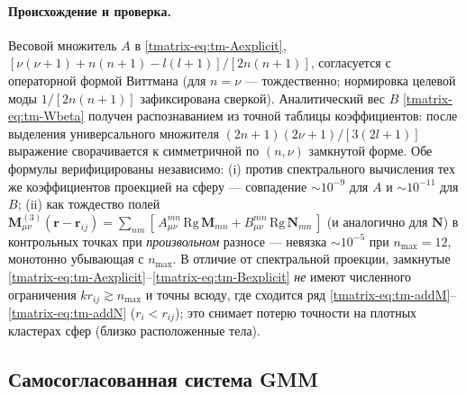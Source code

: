 \documentclass[11pt,a4paper]{article}
\begin{document}
\paragraph{Происхождение и проверка.} Весовой множитель $A$ в \eqref{tmatrix-eq:tm-Aexplicit}, $[\nu(\nu{+}1)+n(n{+}1)-l(l{+}1)]/[2n(n{+}1)]$, согласуется с операторной формой Виттмана \cite{wittmann1988} (для $n=\nu$ --- тождественно; нормировка целевой моды $1/[2n(n{+}1)]$ зафиксирована сверкой). Аналитический вес $B$ \eqref{tmatrix-eq:tm-Wbeta} получен распознаванием из точной таблицы коэффициентов: после выделения универсального множителя $(2n{+}1)(2\nu{+}1)/[3(2l{+}1)]$ выражение сворачивается к симметричной по $(n,\nu)$ замкнутой форме. Обе формулы верифицированы независимо: (i) против спектрального вычисления тех же коэффициентов проекцией на сферу --- совпадение $\sim\!10^{-9}$ для $A$ и $\sim\!10^{-11}$ для $B$; (ii) как тождество полей $\bm M^{(3)}_{\mu\nu}(\bm r-\bm r_{ij})=\sum_{nm}[\,A_{\mu\nu}^{mn}\,\mathrm{Rg}\,\bm M_{mn}+B_{\mu\nu}^{mn}\,\mathrm{Rg}\,\bm N_{mn}\,]$ (и аналогично для $\bm N$) в контрольных точках при \emph{произвольном} разносе --- невязка $\sim\!10^{-5}$ при $n_{\max}=12$, монотонно убывающая с $n_{\max}$. В отличие от спектральной проекции, замкнутые \eqref{tmatrix-eq:tm-Aexplicit}--\eqref{tmatrix-eq:tm-Bexplicit} \emph{не} имеют численного ограничения $k r_{ij}\gtrsim n_{\max}$ и точны всюду, где сходится ряд \eqref{tmatrix-eq:tm-addM}--\eqref{tmatrix-eq:tm-addN} ($r_i<r_{ij}$); это снимает потерю точности на плотных кластерах сфер (близко расположенные тела).

\subsection{Самосогласованная система GMM}
\label{tmatrix-sec:tm-system}
\end{document}
